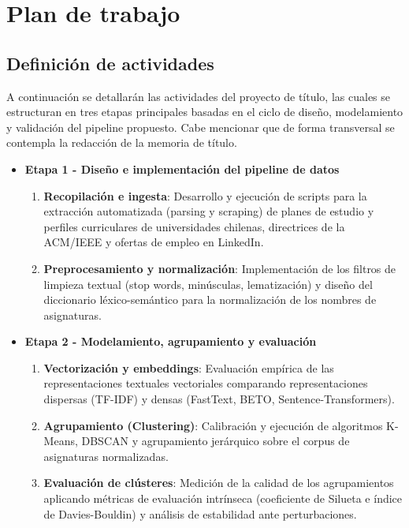 \section{Plan de trabajo}
\label{cap:Schedule}

\subsection{Definición de actividades}
\label{sec:activitiesDefinition}

A continuación se detallarán las actividades del proyecto de título, las cuales se estructuran en tres etapas principales basadas en el ciclo de diseño, modelamiento y validación del pipeline propuesto. Cabe mencionar que de forma transversal se contempla la redacción de la memoria de título.

\begin{itemize}
    \item \textbf{Etapa 1 - Diseño e implementación del pipeline de datos}
        \begin{enumerate}
            \item \textbf{Recopilación e ingesta}: Desarrollo y ejecución de scripts para la extracción automatizada (parsing y scraping) de planes de estudio y perfiles curriculares de universidades chilenas, directrices de la ACM/IEEE y ofertas de empleo en LinkedIn.
            \item \textbf{Preprocesamiento y normalización}: Implementación de los filtros de limpieza textual (stop words, minúsculas, lematización) y diseño del diccionario léxico-semántico para la normalización de los nombres de asignaturas.
        \end{enumerate}
    
    \item \textbf{Etapa 2 - Modelamiento, agrupamiento y evaluación}
        \begin{enumerate}
            \item \textbf{Vectorización y embeddings}: Evaluación empírica de las representaciones textuales vectoriales comparando representaciones dispersas (TF-IDF) y densas (FastText, BETO, Sentence-Transformers).
            \item \textbf{Agrupamiento (Clustering)}: Calibración y ejecución de algoritmos K-Means, DBSCAN y agrupamiento jerárquico sobre el corpus de asignaturas normalizadas.
            \item \textbf{Evaluación de clústeres}: Medición de la calidad de los agrupamientos aplicando métricas de evaluación intrínseca (coeficiente de Silueta e índice de Davies-Bouldin) y análisis de estabilidad ante perturbaciones.
        \end{enumerate}
    

\end{itemize}
